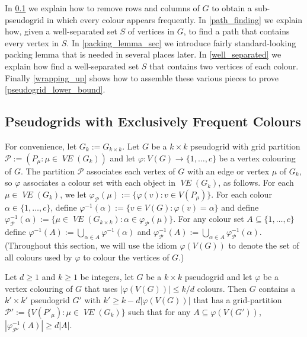 \documentclass{patmorin}
\DeclareMathOperator{\VE}{\mathit{VE}}
\begin{document}
In \cref{only_frequent_sec} we explain how to remove rows and columns of $G$ to obtain a sub-pseudogrid in which every colour appears frequently.  In \cref{path_finding} we explain how, given a well-separated set $S$ of vertices in $G$, to find a path that contains every vertex in $S$.  In \cref{packing_lemma_sec} we introduce fairly standard-looking packing lemma that is needed in several places later.  In \cref{well_separated} we explain how find a well-separated set $S$ that contains two vertices of each colour. Finally \cref{wrapping_up} shows how to assemble these various pieces to prove \cref{pseudogrid_lower_bound}.



\subsection{Pseudogrids with Exclusively Frequent Colours}
\label{only_frequent_sec}

For convenience, let $G_k:=G_{k\times k}$.
Let $G$ be a $k\times k$ pseudogrid with grid partition $\mathcal{P}:=(P_\mu:\mu\in\VE(G_{k}))$ and let $\varphi:V(G)\to\{1,\ldots,c\}$ be a vertex colouring of $G$.  The partition $\mathcal{P}$ associates each vertex of $G$ with an edge or vertex $\mu$ of $G_k$, so $\varphi$ associates a colour set with each object in $\VE(G_k)$, as follows.  For each $\mu\in\VE(G_{k})$, we let $\varphi_{\mathcal{P}}(\mu):=\{\varphi(v):v\in V(P_\mu)\}$.  For each colour $\alpha\in\{1,\ldots,c\}$, define $\varphi^{-1}(\alpha):=\{v\in V(G):\varphi(v)=\alpha\}$ and define $\varphi_\mathcal{P}^{-1}(\alpha):=\{\mu\in \VE(G_{k\times k}):\alpha\in\varphi_\mathcal{P}(\mu)\}$.  For any colour set $A\subseteq\{1,\ldots,c\}$ define $\varphi^{-1}(A):=\bigcup_{\alpha\in A}\varphi^{-1}(\alpha)$ and $\varphi_\mathcal{P}^{-1}(A):=\bigcup_{\alpha\in A}\varphi_{\mathcal{P}}^{-1}(\alpha)$.  (Throughout this section, we will use the idiom $\varphi(V(G))$ to denote the set of all colours used by $\varphi$ to colour the vertices of $G$.)


\begin{lem}\label{only_frequent}
  Let $d\ge 1$ and $k\ge 1$ be integers, let $G$ be a $k\times k$ pseudogrid and let $\varphi$ be a vertex colouring of $G$ that uses $|\varphi(V(G))|\le k/d$ colours.
  Then $G$ contains a $k'\times k'$ pseudogrid $G'$ with $k'\ge k - d|\varphi(V(G))|$ that has a grid-partition $\mathcal{P}':=\{V(P'_\mu):\mu\in \VE(G_{k})\}$ such that
  for any $A\subseteq \varphi(V(G'))$, $|\varphi_{\mathcal{P}'}^{-1}(A)| \ge d|A|$.
\end{lem}
\end{document}

